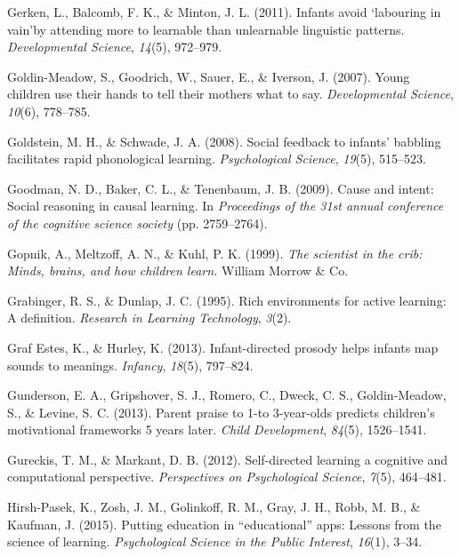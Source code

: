 \documentclass[english,man]{apa6}
\theoremstyle{definition}
\theoremstyle{definition}
\theoremstyle{definition}
\theoremstyle{remark}
\begin{document}
\hypertarget{ref-gerken2011infants}{}
Gerken, L., Balcomb, F. K., \& Minton, J. L. (2011). Infants avoid
`labouring in vain'by attending more to learnable than unlearnable
linguistic patterns. \emph{Developmental Science}, \emph{14}(5),
972--979.

\hypertarget{ref-goldin2007young}{}
Goldin-Meadow, S., Goodrich, W., Sauer, E., \& Iverson, J. (2007). Young
children use their hands to tell their mothers what to say.
\emph{Developmental Science}, \emph{10}(6), 778--785.

\hypertarget{ref-goldstein2008social}{}
Goldstein, M. H., \& Schwade, J. A. (2008). Social feedback to infants'
babbling facilitates rapid phonological learning. \emph{Psychological
Science}, \emph{19}(5), 515--523.

\hypertarget{ref-goodman2009cause}{}
Goodman, N. D., Baker, C. L., \& Tenenbaum, J. B. (2009). Cause and
intent: Social reasoning in causal learning. In \emph{Proceedings of the
31st annual conference of the cognitive science society} (pp.
2759--2764).

\hypertarget{ref-gopnik1999scientist}{}
Gopnik, A., Meltzoff, A. N., \& Kuhl, P. K. (1999). \emph{The scientist
in the crib: Minds, brains, and how children learn.} William Morrow \&
Co.

\hypertarget{ref-grabinger1995rich}{}
Grabinger, R. S., \& Dunlap, J. C. (1995). Rich environments for active
learning: A definition. \emph{Research in Learning Technology},
\emph{3}(2).

\hypertarget{ref-graf2013infant}{}
Graf Estes, K., \& Hurley, K. (2013). Infant-directed prosody helps
infants map sounds to meanings. \emph{Infancy}, \emph{18}(5), 797--824.

\hypertarget{ref-gunderson2013parent}{}
Gunderson, E. A., Gripshover, S. J., Romero, C., Dweck, C. S.,
Goldin-Meadow, S., \& Levine, S. C. (2013). Parent praise to 1-to
3-year-olds predicts children's motivational frameworks 5 years later.
\emph{Child Development}, \emph{84}(5), 1526--1541.

\hypertarget{ref-gureckis2012self}{}
Gureckis, T. M., \& Markant, D. B. (2012). Self-directed learning a
cognitive and computational perspective. \emph{Perspectives on
Psychological Science}, \emph{7}(5), 464--481.

\hypertarget{ref-hirsh2015putting}{}
Hirsh-Pasek, K., Zosh, J. M., Golinkoff, R. M., Gray, J. H., Robb, M.
B., \& Kaufman, J. (2015). Putting education in ``educational'' apps:
Lessons from the science of learning. \emph{Psychological Science in the
Public Interest}, \emph{16}(1), 3--34.
\end{document}
